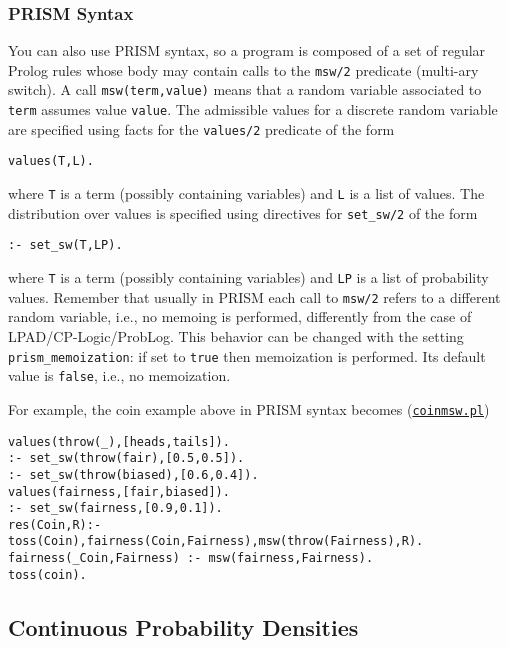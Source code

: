 \subsubsection{PRISM Syntax}
You can also use PRISM \cite{DBLP:conf/ijcai/SatoK97} syntax, so a program is composed of
a set of regular Prolog rules whose body may contain calls to the \verb|msw/2| predicate (multi-ary 
switch). A call \verb|msw(term,value)| means that a random variable associated to \verb|term|
assumes value \verb|value|. The admissible values  for a discrete random variable are 
specified using facts for the \verb|values/2| predicate of the form
\begin{verbatim}
values(T,L).
\end{verbatim}
where \verb|T| is a term (possibly containing variables) and \verb|L| is a list of values.
The distribution over values is specified using directives for \verb|set_sw/2| of the form
\begin{verbatim}
:- set_sw(T,LP).
\end{verbatim}
where \verb|T| is a term (possibly containing variables) and \verb|LP| is a list of
probability values.
Remember that usually in PRISM each call to \verb|msw/2| refers to a different random
variable, i.e., no memoing is performed, differently from the case of LPAD/CP-Logic/ProbLog.
This behavior can be changed with the setting \verb|prism_memoization|: if set to \verb|true| then 
memoization is performed. Its default value is \verb|false|, i.e., no memoization.

For example, the coin example above in PRISM syntax becomes
(\href{http://cplint.eu/example/inference/coinmsw.pl}{\texttt{coinmsw.pl}})
\begin{verbatim}
values(throw(_),[heads,tails]).
:- set_sw(throw(fair),[0.5,0.5]).
:- set_sw(throw(biased),[0.6,0.4]).
values(fairness,[fair,biased]).
:- set_sw(fairness,[0.9,0.1]).
res(Coin,R):- toss(Coin),fairness(Coin,Fairness),msw(throw(Fairness),R).
fairness(_Coin,Fairness) :- msw(fairness,Fairness).
toss(coin).
\end{verbatim}
\subsection{Continuous Probability Densities}
\label{cont}


